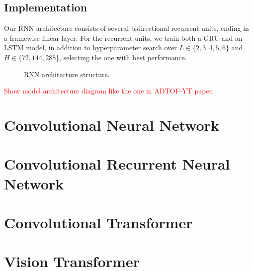 \subsection{Implementation}

Our \gls{RNN} architecture consists of several bidirectional recurrent units, ending in a framewise linear layer. For the recurrent units, we train both a \gls{GRU} and an \gls{LSTM} model, in addition to hyperparameter search over $L \in \{2, 3, 4, 5, 6\}$ and $H \in \{72, 144, 288\}$, selecting the one with best performance.

\begin{figure}[H]
    \centering
    
    \caption{RNN architecture structure.}
    \label{RNNFigure}
\end{figure}

\textcolor{red}{Show model architecture diagram like the one in ADTOF-YT paper}.

\section{Convolutional Neural Network}

\section{Convolutional Recurrent Neural Network}

\section{Convolutional Transformer}

\section{Vision Transformer}